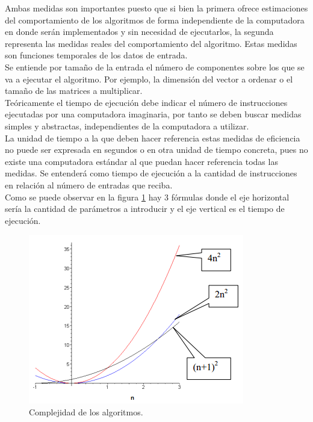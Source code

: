 \hspace*{1cm}Ambas medidas son importantes puesto que si bien la primera  ofrece estimaciones del comportamiento de los algoritmos de forma independiente de  la computadora en donde serán implementados y sin necesidad de ejecutarlos, la segunda representa las medidas reales del comportamiento del algoritmo. Estas medidas son funciones temporales de los datos de entrada.\\
\hspace*{1cm}Se entiende por tamaño de la entrada el número de componentes sobre los que se va a ejecutar el algoritmo. Por ejemplo, la dimensión del vector a ordenar o el tamaño de las matrices a multiplicar.\\ 
\hspace*{1cm}Teóricamente el tiempo de ejecución debe indicar el número de instrucciones ejecutadas por una computadora imaginaria, por tanto se deben buscar medidas simples y abstractas, independientes de la computadora a utilizar.\\
\hspace*{1cm}La unidad de tiempo a la que deben hacer referencia estas medidas de eficiencia no puede ser expresada en segundos o en otra unidad de tiempo concreta, pues no existe una computadora estándar al que puedan hacer referencia todas las medidas. Se entenderá como tiempo de ejecución a la cantidad de instrucciones en relación al número de entradas que reciba.\\
\hspace*{1cm} Como se puede observar en la figura \ref {fig:Cap2_1_1} hay 3 fórmulas donde el eje horizontal sería la cantidad de parámetros a introducir y el eje vertical es el tiempo de ejecución.

    \begin{figure}[hbtp]
        \centering
            \includegraphics{MarcoTeorico/Imagenes/Cap2_1_1.png}
            \caption{Complejidad de los algoritmos.}      
            \label{fig:Cap2_1_1}
    \end{figure}    
    
